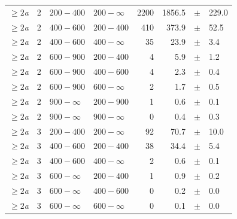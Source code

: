 \begin{table}[!h]
\begin{tabular}{rrllrrcl}
$\geq 2${\it a}\T & 2 & $ 200- 400$ & $200-\infty$ &   2200 &   1856.5 &$\pm$&  229.0 \\
$\geq 2${\it a}\T & 2 & $ 400- 600$ & $200-400$ &    410 &    373.9 &$\pm$&   52.5 \\
$\geq 2${\it a} & 2 & $ 400- 600$ & $400-\infty$ &     35 &     23.9 &$\pm$&    3.4 \\
$\geq 2${\it a}\T & 2 & $ 600- 900$ & $200-400$ &      4 &      5.9 &$\pm$&    1.2 \\
$\geq 2${\it a} & 2 & $ 600- 900$ & $400-600$ &      4 &      2.3 &$\pm$&    0.4 \\
$\geq 2${\it a} & 2 & $ 600- 900$ & $600-\infty$ &      2 &      1.7 &$\pm$&    0.5 \\
$\geq 2${\it a}\T & 2 & $ 900- \infty$ & $200-900$ &      1 &      0.6 &$\pm$&    0.1 \\
$\geq 2${\it a} & 2 & $ 900- \infty$ & $900-\infty$ &      0 &      0.4 &$\pm$&    0.3 \\
$\geq 2${\it a}\T & 3 & $ 200- 400$ & $200-\infty$ &     92 &     70.7 &$\pm$&   10.0 \\
$\geq 2${\it a}\T & 3 & $ 400- 600$ & $200-400$ &     38 &     34.4 &$\pm$&    5.4 \\
$\geq 2${\it a} & 3 & $ 400- 600$ & $400-\infty$ &      2 &      0.6 &$\pm$&    0.1 \\
$\geq 2${\it a}\T & 3 & $ 600- \infty$ & $200-400$ &      1 &      0.9 &$\pm$&    0.2 \\
$\geq 2${\it a} & 3 & $ 600- \infty$ & $400-600$ &      0 &      0.2 &$\pm$&    0.0 \\
$\geq 2${\it a} & 3 & $ 600- \infty$ & $600-\infty$ &      0 &      0.1 &$\pm$&    0.0 \\
    \hline
  \end{tabular}
\end{table}

